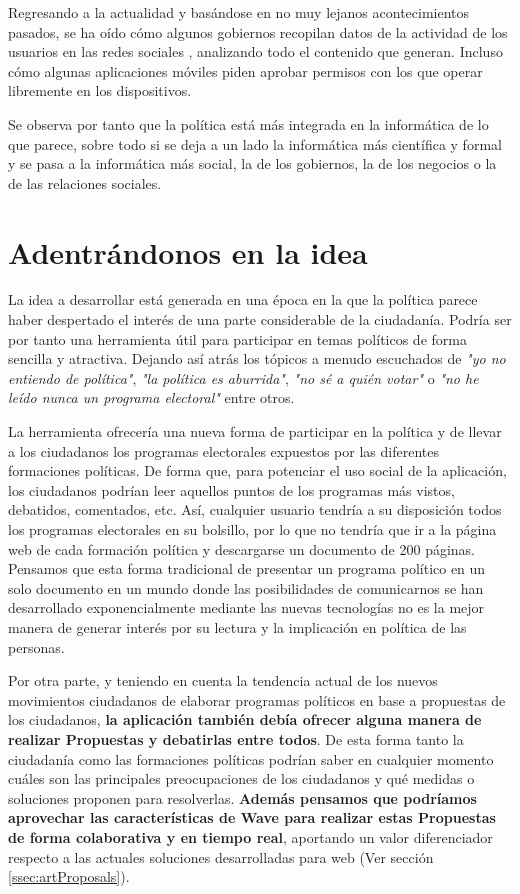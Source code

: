 Regresando a la actualidad y basándose en no muy lejanos acontecimientos pasados, se ha oído cómo algunos gobiernos recopilan datos de la actividad de los usuarios en las redes sociales \cite{ref:NSAData}, analizando todo el contenido que generan. Incluso cómo algunas aplicaciones móviles piden aprobar permisos con los que operar libremente en los dispositivos.

Se observa por tanto que la política está más integrada en la informática de lo que parece, sobre todo si se deja a un lado la informática más científica y formal y se pasa a la informática más social, la de los gobiernos, la de los negocios o la de las relaciones sociales.

\section{Adentrándonos en la idea}

La idea a desarrollar está generada en una época en la que la política parece haber despertado el interés de una parte considerable de la ciudadanía. Podría ser por tanto una herramienta útil para participar en temas políticos de forma sencilla y atractiva. Dejando así atrás los tópicos a menudo escuchados de \textit{"yo no entiendo de política"}, \textit{"la política es aburrida"}, \textit{"no sé a quién votar"} o \textit{"no he leído nunca un programa electoral"} entre otros.

La herramienta ofrecería una nueva forma de participar en la política y de llevar a los ciudadanos los programas electorales expuestos por las diferentes formaciones políticas. De forma que, para potenciar el uso social de la aplicación, los ciudadanos podrían leer aquellos puntos de los programas más vistos, debatidos, comentados, etc. Así, cualquier usuario tendría a su disposición todos los programas electorales en su bolsillo, por lo que no tendría que ir a la página web de cada formación política y descargarse un documento de 200 páginas. Pensamos que esta forma tradicional de presentar un programa político en un solo documento en un mundo donde las posibilidades de comunicarnos se han desarrollado exponencialmente mediante las nuevas tecnologías no es la mejor manera de generar interés por su lectura y la implicación en política de las personas.

Por otra parte, y teniendo en cuenta la tendencia actual de los nuevos movimientos ciudadanos de elaborar programas políticos en base a propuestas de los ciudadanos, \textbf{la aplicación también debía ofrecer alguna manera de realizar Propuestas y debatirlas entre todos}. De esta forma tanto la ciudadanía como las formaciones políticas podrían saber en cualquier momento cuáles son las principales preocupaciones de los ciudadanos y qué medidas o soluciones proponen para resolverlas. \textbf{Además pensamos que podríamos aprovechar las características de Wave para realizar estas Propuestas de forma colaborativa y en tiempo real}, aportando un valor diferenciador respecto a las actuales soluciones desarrolladas para web (Ver sección \ref{ssec:artProposals}).

